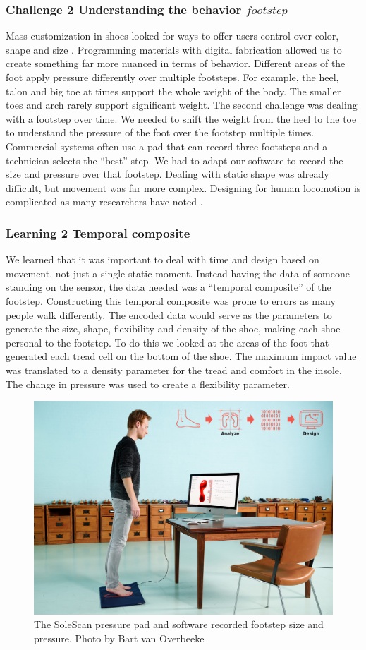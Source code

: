 \subsubsection{Challenge 2 Understanding the behavior \(footstep\)}

Mass customization in shoes looked for ways to offer users control over color, shape and size \cite{Piller2012}. Programming materials with digital fabrication allowed us to create something far more nuanced in terms of behavior. Different areas of the foot apply pressure differently over multiple footsteps. For example, the heel, talon and big toe at times support the whole weight of the body. The smaller toes and arch rarely support significant weight. The second challenge was dealing with a footstep over time. We needed to shift the weight from the heel to the toe to understand the pressure of the foot over the footstep multiple times. Commercial systems often use a pad that can record three footsteps and a technician selects the ``best'' step. We had to adapt our software to record the size and pressure over that footstep. Dealing with static shape was already difficult, but movement was far more complex. Designing for human locomotion is complicated as many researchers have noted \cite{Lindqvist2014,Lindqvist2015,Bickel2010}.  

\subsubsection{Learning 2 Temporal composite}

We learned that it was important to deal with time and design based on movement, not just a single static moment. Instead having the data of someone standing on the sensor, the data needed was a ``temporal composite'' \cite{Koegel1992} of the footstep. Constructing this temporal composite was prone to errors as many people walk differently. The encoded data would serve as the parameters to generate the size, shape, flexibility and density of the shoe, making each shoe personal to the footstep. To do this we looked at the areas of the foot that generated each tread cell on the bottom of the shoe. The maximum impact value was translated to a density parameter for the tread and comfort in the insole. The change in pressure was used to create a flexibility parameter. 

\begin{figure}
\includegraphics[width=.5\textwidth]{SoleScan}
\caption{The SoleScan pressure pad and software recorded footstep size and pressure. Photo by Bart van Overbeeke}
\label{fig:Project1}
\end{figure}

